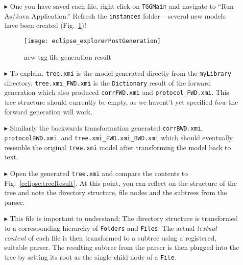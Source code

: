 \begin{enumerate} 

\item[$\blacktriangleright$] One you have saved each file, right click on \texttt{TGGMain} and navigate to ``Run As/Java Application.'' Refresh the
\texttt{instances} folder --  several new models have been created (Fig.~\ref{eclipse:postParse})!

\vspace{0.5cm}

\begin{figure}[!htbp]
\begin{center}
 \texttt{[image: eclipse\_explorerPostGeneration]}
  \caption{new tgg file generation result}
  \label{eclipse:postParse}
\end{center}
\end{figure} 

\item[$\blacktriangleright$] To explain, \texttt{tree.xmi} is the model generated directly from the \texttt{myLibrary} directory. \texttt{tree.xmi\_FWD.xmi} is
the \texttt{Dictionary} result of the forward generation which also produced \texttt{corrFWD.xmi} and \texttt{protocol\_FWD.xmi}. This tree structure should
currently be empty, as we havent't yet specified \emph{how} the forward generation will work.

\vspace{0.5cm}

\item[$\blacktriangleright$] Similarly the backwards transformation generated \texttt{corrBWD.xmi}, \texttt{protocolBWD.xmi}, and
\texttt{tree.xmi\_FWD.xmi\_BWD.xmi} which should eventually resemble the original \texttt{tree.xmi} model after transforming the model back to text.

\clearpage

\item[$\blacktriangleright$] Open the generated \texttt{tree.xmi} and compare the contents to Fig.~\ref{eclipse:treeResult}. At this point, you can reflect on
the structure of the tree and note the directory structure, file nodes and the subtrees from the parser. 

\vspace{0.5cm}

\item[$\blacktriangleright$] This file is important to understand; The directory
structure is transformed to a corresponding hierarchy of \texttt{Folders} and \texttt{Files}. The actual \emph{textual content} of each file is then transformed
to a subtree using a registered, suitable parser. The resulting subtree from the parser is then plugged into the tree by setting its root as the single child
node of a \texttt{File}.

\end{enumerate}

